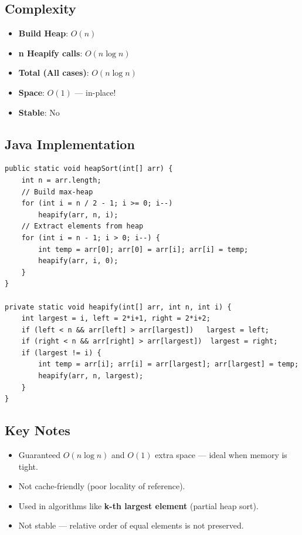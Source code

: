 \documentclass[12pt,a4paper]{article}
\begin{document}
\subsection{Complexity}
\begin{itemize}
    \item \textbf{Build Heap}: $O(n)$
    \item \textbf{n Heapify calls}: $O(n \log n)$
    \item \textbf{Total (All cases)}: $O(n \log n)$
    \item \textbf{Space}: $O(1)$ — in-place!
    \item \textbf{Stable}: No
\end{itemize}

\subsection{Java Implementation}
\begin{lstlisting}[style=javastyle, caption={Heap Sort — Java}]
public static void heapSort(int[] arr) {
    int n = arr.length;
    // Build max-heap
    for (int i = n / 2 - 1; i >= 0; i--)
        heapify(arr, n, i);
    // Extract elements from heap
    for (int i = n - 1; i > 0; i--) {
        int temp = arr[0]; arr[0] = arr[i]; arr[i] = temp;
        heapify(arr, i, 0);
    }
}

private static void heapify(int[] arr, int n, int i) {
    int largest = i, left = 2*i+1, right = 2*i+2;
    if (left < n && arr[left] > arr[largest])   largest = left;
    if (right < n && arr[right] > arr[largest])  largest = right;
    if (largest != i) {
        int temp = arr[i]; arr[i] = arr[largest]; arr[largest] = temp;
        heapify(arr, n, largest);
    }
}
\end{lstlisting}

\subsection{Key Notes}
\begin{itemize}
    \item Guaranteed $O(n \log n)$ and $O(1)$ extra space — ideal when memory is tight.
    \item Not cache-friendly (poor locality of reference).
    \item Used in algorithms like \textbf{k-th largest element} (partial heap sort).
    \item Not stable — relative order of equal elements is not preserved.
\end{itemize}
\end{document}
